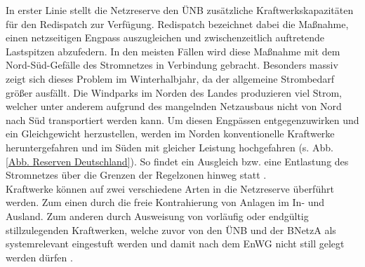 			In erster Linie stellt die Netzreserve den ÜNB zusätzliche Kraftwerkskapazitäten für den Redispatch zur Verfügung.
			Redispatch bezeichnet dabei die Maßnahme, einen netzseitigen Engpass auszugleichen und zwischenzeitlich auftretende Lastspitzen abzufedern.
			In den meisten Fällen wird diese Maßnahme mit dem Nord-Süd-Gefälle des Stromnetzes in Verbindung gebracht.
			Besonders massiv zeigt sich dieses Problem im Winterhalbjahr, da der allgemeine Strombedarf größer ausfällt.
			Die Windparks im Norden des Landes produzieren viel Strom, welcher unter anderem aufgrund des mangelnden Netzausbaus nicht von Nord nach Süd transportiert werden kann.
			Um diesen Engpässen entgegenzuwirken und ein Gleichgewicht herzustellen, werden im Norden konventionelle Kraftwerke heruntergefahren und im Süden mit gleicher Leistung hochgefahren (s. Abb. \ref{Abb. Reserven Deutschland}).
			So findet ein Ausgleich bzw. eine Entlastung des Stromnetzes über die Grenzen der Regelzonen hinweg statt \cite{Netz_Kapa_Reserve_NextKraftwerke}. \\
			
			Kraftwerke können auf zwei verschiedene Arten in die Netzreserve überführt werden.
			Zum einen durch die freie Kontrahierung von Anlagen im In- und Ausland.
			Zum anderen durch Ausweisung von vorläufig oder endgültig stillzulegenden Kraftwerken, welche zuvor von den ÜNB und der BNetzA als systemrelevant eingestuft werden und damit nach dem EnWG nicht still gelegt werden dürfen \cite{EnWG}. \\
			

